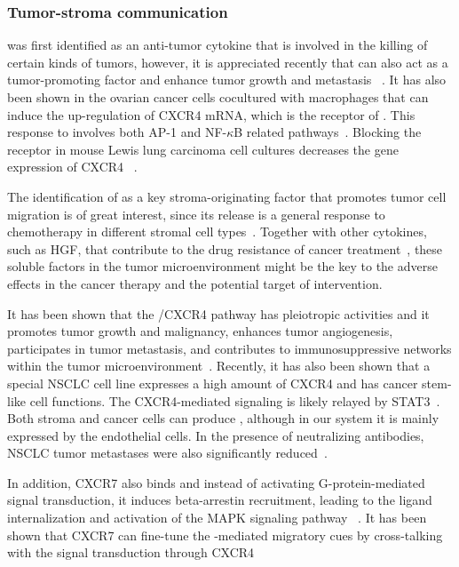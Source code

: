 \subsubsection{Tumor-stroma communication}

\tnfa was first identified as an anti-tumor cytokine that is involved in the killing
of certain kinds of tumors, however, it is appreciated recently that \tnfa can also 
act as a tumor-promoting factor and enhance tumor growth and metastasis%
~\citep{Wu2010}. It has also been shown in the ovarian cancer cells cocultured with
macrophages that \tnfa can induce the up-regulation of 
CXCR4 mRNA, which is the receptor of \sdfonea. This response to \tnfa involves both
AP-1 and NF-$\kappa$B related pathways~\citep{Kulbe2005}. Blocking the \tnfa receptor
in mouse Lewis lung carcinoma cell cultures decreases the gene expression of CXCR4~%
\citep{Sasi2011}.

The identification of \tnfa as a key stroma-originating factor that promotes 
tumor cell migration is of great interest, since its release is a general response to chemotherapy in different stromal cell types~\citep{Acharyya2012}. Together with
other cytokines, such as HGF, that contribute to the drug resistance of cancer
treatment~\citep{Straussman2012}, these soluble factors in the tumor microenvironment
might be the key to the adverse effects in the cancer therapy and the potential target of intervention.

It has been shown that the \sdfonea/CXCR4 pathway has pleiotropic activities and it 
promotes tumor growth and malignancy, enhances tumor angiogenesis, participates in tumor metastasis, and contributes to immunosuppressive networks within the tumor microenvironment~\citep{Kryczek2007}. 
Recently, it has also been shown that a special NSCLC cell line expresses a
high amount of CXCR4 and has cancer stem-like cell functions. The CXCR4-mediated
signaling is likely relayed by STAT3~\citep{Jung2013}.
Both stroma and cancer cells can produce \sdfonea, 
although in our system it is mainly expressed by the endothelial cells. In the presence of neutralizing \sdfonea antibodies, NSCLC tumor metastases were also significantly reduced~\citep{Phillips2003}.

In addition, CXCR7 also binds \sdfonea and instead of 
activating G-protein-mediated signal transduction, it induces 
beta-arrestin
recruitment, leading to the ligand internalization and 
activation of the MAPK signaling pathway%
~\citep{Rajagopal2010a}. It has been shown that CXCR7 can
fine-tune the \sdfonea-mediated migratory cues by cross-talking
with the signal transduction through CXCR4%
~\citep{Zabel2009,Liberman2012f}


